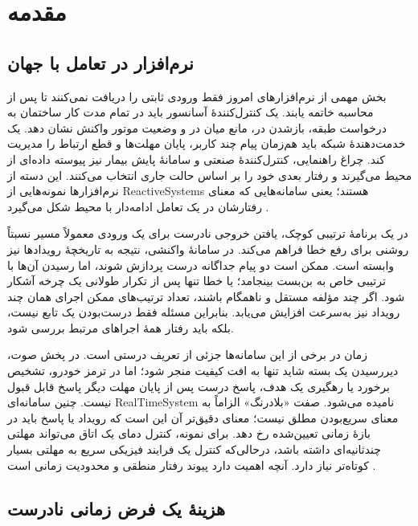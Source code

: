 
\chapter{مقدمه}
\label{chap:introduction}

\section{نرم‌افزار در تعامل با جهان}

بخش مهمی از نرم‌افزارهای امروز فقط ورودی ثابتی را دریافت نمی‌کنند تا پس از محاسبه خاتمه یابند. یک کنترل‌کنندهٔ آسانسور باید در تمام مدت کار ساختمان به درخواست طبقه، بازشدن در، مانع میان در و وضعیت موتور واکنش نشان دهد. یک خدمت‌دهندهٔ شبکه باید هم‌زمان پیام چند کاربر، پایان مهلت‌ها و قطع ارتباط را مدیریت کند. چراغ راهنمایی، کنترل‌کنندهٔ صنعتی و سامانهٔ پایش بیمار نیز پیوسته داده‌ای از محیط می‌گیرند و رفتار بعدی خود را بر اساس حالت جاری انتخاب می‌کنند. این دسته از نرم‌افزارها نمونه‌هایی از \glspl{ReactiveSystem} هستند؛ یعنی سامانه‌هایی که معنای رفتارشان در یک تعامل ادامه‌دار با محیط شکل می‌گیرد \cite{SirjaniEtAl2004Rebeca,Sirjani2004Thesis}.

در یک برنامهٔ ترتیبی کوچک، یافتن خروجی نادرست برای یک ورودی معمولاً مسیر نسبتاً روشنی برای رفع خطا فراهم می‌کند. در سامانهٔ واکنشی، نتیجه به تاریخچهٔ رویدادها نیز وابسته است. ممکن است دو پیام جداگانه درست پردازش شوند، اما رسیدن آن‌ها با ترتیبی خاص به بن‌بست بینجامد؛ یا خطا تنها پس از تکرار طولانی یک چرخه آشکار شود. اگر چند مؤلفه مستقل و ناهمگام باشند، تعداد ترتیب‌های ممکن اجرای همان چند رویداد نیز به‌سرعت افزایش می‌یابد. بنابراین مسئله فقط درست‌بودن یک تابع نیست، بلکه باید رفتار همهٔ اجراهای مرتبط بررسی شود.

زمان در برخی از این سامانه‌ها جزئی از تعریف درستی است. در پخش صوت، دیررسیدن یک بسته شاید تنها به افت کیفیت منجر شود؛ اما در ترمز خودرو، تشخیص برخورد یا رهگیری یک هدف، پاسخ درست پس از پایان مهلت دیگر پاسخ قابل قبول نیست. چنین سامانه‌ای \gls{RealTimeSystem} نامیده می‌شود. صفت «بلادرنگ» الزاماً به معنای سریع‌بودن مطلق نیست؛ معنای دقیق‌تر آن این است که رویداد یا پاسخ باید در بازهٔ زمانی تعیین‌شده رخ دهد. برای نمونه، کنترل دمای یک اتاق می‌تواند مهلتی چندثانیه‌ای داشته باشد، درحالی‌که کنترل یک فرایند فیزیکی سریع به مهلتی بسیار کوتاه‌تر نیاز دارد. آنچه اهمیت دارد پیوند رفتار منطقی و محدودیت زمانی است \cite{AlurDill1990,AlurDill1994}.

\section{هزینهٔ یک فرض زمانی نادرست}

